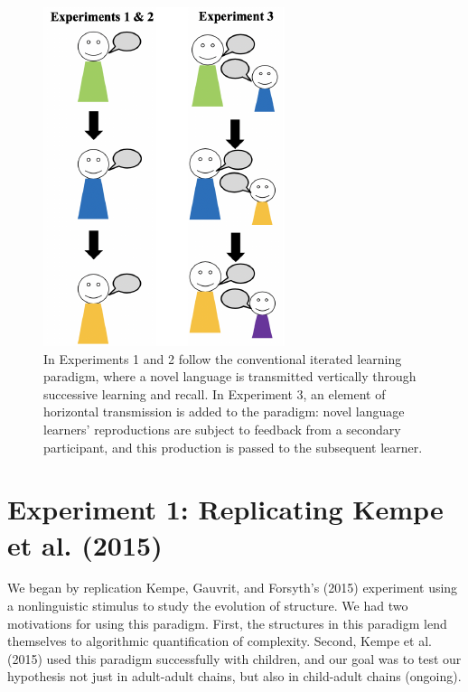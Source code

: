\documentclass[10pt, letterpaper]{article}
\newenvironment{CodeChunk}{}{}
\begin{document}
\begin{CodeChunk}
\begin{figure}[tb]

{\centering \includegraphics{figs/baseline_schem-1} 

}

\caption[In Experiments 1 and 2 follow the conventional iterated learning paradigm, where a novel language is transmitted vertically through successive learning and recall]{In Experiments 1 and 2 follow the conventional iterated learning paradigm, where a novel language is transmitted vertically through successive learning and recall. In Experiment 3, an element of horizontal transmission is added to the paradigm: novel language learners' reproductions are subject to feedback from a secondary participant, and this production is passed to the subsequent learner.}\label{fig:baseline_schem}
\end{figure}
\end{CodeChunk}

\section{Experiment 1: Replicating Kempe et al.
(2015)}\label{experiment-1-replicating-kempe-2015}

We began by replication Kempe, Gauvrit, and Forsyth's (2015) experiment
using a nonlinguistic stimulus to study the evolution of structure. We
had two motivations for using this paradigm. First, the structures in
this paradigm lend themselves to algorithmic quantification of
complexity. Second, Kempe et al. (2015) used this paradigm successfully
with children, and our goal was to test our hypothesis not just in
adult-adult chains, but also in child-adult chains (ongoing).
\end{document}
